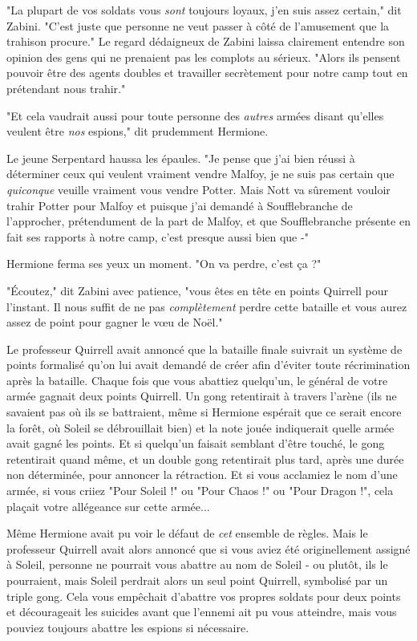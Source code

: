"La plupart de vos soldats vous \emph{sont}  toujours loyaux, j'en suis assez certain," dit Zabini. "C'est juste que personne ne veut passer à côté de l'amusement que la trahison procure." Le regard dédaigneux de Zabini laissa clairement entendre son opinion des gens qui ne prenaient pas les complots au sérieux. "Alors ils pensent pouvoir être des agents doubles et travailler secrètement pour notre camp tout en prétendant nous trahir."

"Et cela vaudrait aussi pour toute personne des \emph{autres}  armées disant qu'elles veulent être \emph{nos } espions," dit prudemment Hermione.

Le jeune Serpentard haussa les épaules. "Je pense que j'ai bien réussi à déterminer ceux qui veulent vraiment vendre Malfoy, je ne suis pas certain que \emph{quiconque}  veuille vraiment vous vendre Potter. Mais Nott va sûrement vouloir trahir Potter pour Malfoy et puisque j'ai demandé à Soufflebranche de l'approcher, prétendument de la part de Malfoy, et que Soufflebranche présente en fait ses rapports à notre camp, c'est presque aussi bien que -"

Hermione ferma ses yeux un moment. "On va perdre, c'est ça ?"

"Écoutez," dit Zabini avec patience, "vous êtes en tête en points Quirrell pour l'instant. Il nous suffit de ne pas \emph{complètement}  perdre cette bataille et vous aurez assez de point pour gagner le vœu de Noël."

Le professeur Quirrell avait annoncé que la bataille finale suivrait un système de points formalisé qu'on lui avait demandé de créer afin d'éviter toute récrimination après la bataille. Chaque fois que vous abattiez quelqu'un, le général de votre armée gagnait deux points Quirrell. Un gong retentirait à travers l'arène (ils ne savaient pas où ils se battraient, même si Hermione espérait que ce serait encore la forêt, où Soleil se débrouillait bien) et la note jouée indiquerait quelle armée avait gagné les points. Et si quelqu'un faisait semblant d'être touché, le gong retentirait quand même, et un double gong retentirait plus tard, après une durée non déterminée, pour annoncer la rétraction. Et si vous acclamiez le nom d'une armée, si vous criiez "Pour Soleil !" ou "Pour Chaos !" ou "Pour Dragon !", cela plaçait votre allégeance sur cette armée...

Même Hermione avait pu voir le défaut de \emph{cet}  ensemble de règles. Mais le professeur Quirrell avait alors annoncé que si vous aviez été originellement assigné à Soleil, personne ne pourrait vous abattre au nom de Soleil - ou plutôt, ils le pourraient, mais Soleil perdrait alors un seul point Quirrell, symbolisé par un triple gong. Cela vous empêchait d'abattre vos propres soldats pour deux points et décourageait les suicides avant que l'ennemi ait pu vous atteindre, mais vous pouviez toujours abattre les espions si nécessaire.

